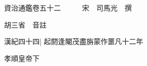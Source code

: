 






























































資治通鑑卷五十二　　　宋　司馬光　撰

胡三省　音註

漢紀四十四|{
	起閼逢閹茂盡旃蒙作噩凡十二年}


孝順皇帝下

